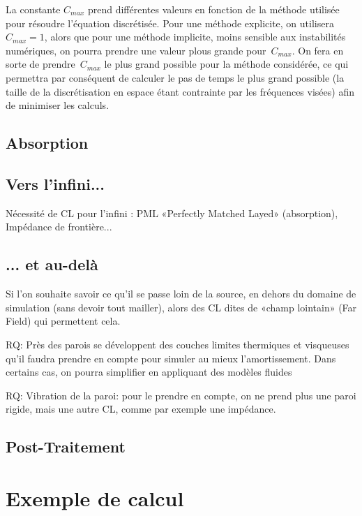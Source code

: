 La constante $C_{max}$ prend différentes valeurs en fonction de la méthode utilisée pour résoudre l'équation discrétisée.
Pour une méthode explicite, on utilisera $C_{max} = 1$, alors que pour une méthode implicite, moins sensible aux instabilités numériques, on pourra prendre une valeur plous grande pour~$C_{max}$.
On fera en sorte de prendre~$C_{max}$ le plus grand possible pour la méthode considérée, ce qui permettra par conséquent de calculer le pas de temps le plus grand possible (la taille de la discrétisation en espace étant contrainte par les fréquences visées) afin de minimiser les calculs.


\medskip
\subsection{Absorption}

\medskip
\subsection{Vers l'infini...}

Nécessité de CL pour l'infini : PML «Perfectly Matched Layed» (absorption), Impédance de frontière...

\medskip
\subsection{... et au-delà}
Si l'on souhaite savoir ce qu'il se passe loin de la source, en dehors du domaine de simulation (sans devoir tout mailler), alors des CL dites de «champ lointain» (Far Field) qui permettent cela.



RQ:
Près des parois se développent des couches limites thermiques et visqueuses qu'il faudra prendre en compte pour simuler au mieux l'amortissement. Dans certains cas, on pourra simplifier en appliquant des modèles fluides

RQ:
Vibration de la paroi: pour le prendre en compte, on ne prend plus une paroi rigide, mais une autre CL, comme par exemple une impédance.

\medskip
\subsection{Post-Traitement}



\medskip
\section{Exemple de calcul}



